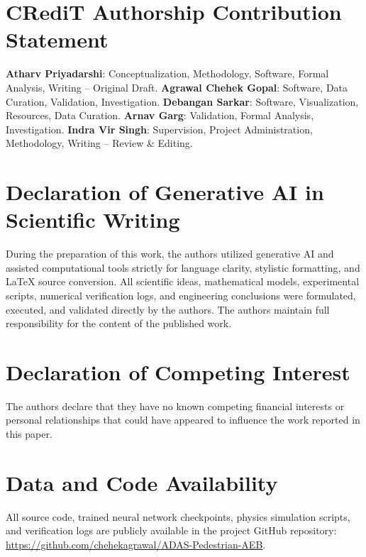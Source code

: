 \documentclass[3p,twocolumn]{elsarticle}
\begin{document}
\section*{CRediT Authorship Contribution Statement}
\textbf{Atharv Priyadarshi}: Conceptualization, Methodology, Software, Formal Analysis, Writing -- Original Draft.
\textbf{Agrawal Chehek Gopal}: Software, Data Curation, Validation, Investigation.
\textbf{Debangan Sarkar}: Software, Visualization, Resources, Data Curation.
\textbf{Arnav Garg}: Validation, Formal Analysis, Investigation.
\textbf{Indra Vir Singh}: Supervision, Project Administration, Methodology, Writing -- Review \& Editing.

\section*{Declaration of Generative AI in Scientific Writing}
During the preparation of this work, the authors utilized generative AI and assisted computational tools strictly for language clarity, stylistic formatting, and LaTeX source conversion. All scientific ideas, mathematical models, experimental scripts, numerical verification logs, and engineering conclusions were formulated, executed, and validated directly by the authors. The authors maintain full responsibility for the content of the published work.

\section*{Declaration of Competing Interest}
The authors declare that they have no known competing financial interests or personal relationships that could have appeared to influence the work reported in this paper.

\section*{Data and Code Availability}
All source code, trained neural network checkpoints, physics simulation scripts, and verification logs are publicly available in the project GitHub repository: \url{https://github.com/chehekagrawal/ADAS-Pedestrian-AEB}.



\end{document}
